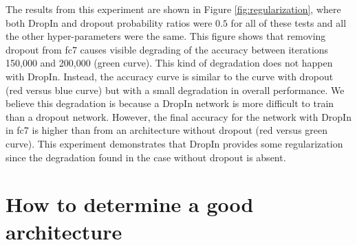 \documentclass[10pt,twocolumn,letterpaper]{article}
\newcommand{\dropin}{DropIn }
\newcommand{\dropinNS}{DropIn}
\begin{document}



The results from this experiment are shown in Figure \ref{fig:regularization},
where both \dropin and dropout probability ratios were $ 0.5 $ for all of these tests and all the other hyper-parameters were the same.
This figure shows that removing dropout from fc7 causes visible degrading of the accuracy between iterations 150,000 and 200,000 (green curve).
This kind of degradation does not happen with \dropinNS.
Instead, the accuracy curve is similar to the curve with dropout (red versus blue curve) but with a small degradation in overall performance.
We believe this degradation is because a \dropin network is more difficult to train than a dropout network.
However, the final accuracy for the network with \dropin in fc7 is higher than from an architecture without dropout (red versus green curve).
This experiment  demonstrates that \dropin provides some regularization since the degradation found in the case without dropout is absent.




\section{How to determine a good architecture}
\end{document}
